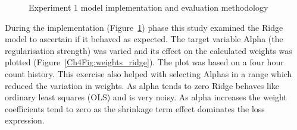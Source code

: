 \begin{figure}[!ht]\centering
    \caption{Experiment 1 model implementation and evaluation methodology}\label{Ch4Fig:exp1_implement}
\end{figure}

During the implementation (Figure~\ref{Ch4Fig:exp1_implement}) phase this study examined the Ridge model to ascertain if it behaved as expected. The target variable Alpha (the regularisation strength) was varied and its effect on the calculated weights was plotted (Figure~\ref{Ch4Fig:weights_ridge}). The plot was based on a four hour count history. This exercise also helped with selecting Alphas in a range which reduced the variation in weights. As alpha tends to zero Ridge behaves like ordinary least squares (OLS) and is very noisy. As alpha increases the weight coefficients tend to zero as the shrinkage term effect dominates the loss expression. 

